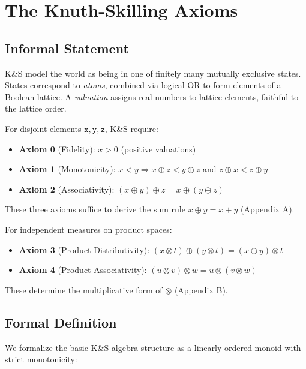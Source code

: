 \documentclass[11pt]{article}
\theoremstyle{definition}
\theoremstyle{remark}
\begin{document}
\section{The Knuth-Skilling Axioms}
\label{sec:axioms}

\subsection{Informal Statement}

K\&S model the world as being in one of finitely many mutually exclusive states.
States correspond to \emph{atoms}, combined via logical OR to form elements of a Boolean lattice.
A \emph{valuation} assigns real numbers to lattice elements, faithful to the lattice order.

For disjoint elements $\mathtt{x}, \mathtt{y}, \mathtt{z}$, K\&S require:
\begin{itemize}
\item \textbf{Axiom 0} (Fidelity): $x > 0$ (positive valuations)
\item \textbf{Axiom 1} (Monotonicity): $x < y \Rightarrow x \oplus z < y \oplus z$ and $z \oplus x < z \oplus y$
\item \textbf{Axiom 2} (Associativity): $(x \oplus y) \oplus z = x \oplus (y \oplus z)$
\end{itemize}

These three axioms suffice to derive the sum rule $x \oplus y = x + y$ (Appendix A).

For independent measures on product spaces:
\begin{itemize}
\item \textbf{Axiom 3} (Product Distributivity): $(x \otimes t) \oplus (y \otimes t) = (x \oplus y) \otimes t$
\item \textbf{Axiom 4} (Product Associativity): $(u \otimes v) \otimes w = u \otimes (v \otimes w)$
\end{itemize}

These determine the multiplicative form of $\otimes$ (Appendix B).

\subsection{Formal Definition}

We formalize the basic K\&S algebra structure as a linearly ordered monoid with strict monotonicity:
\end{document}
